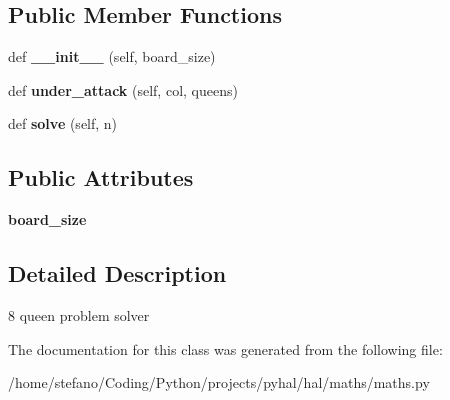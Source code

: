 \subsection*{Public Member Functions}
\begin{DoxyCompactItemize}
\item 
def {\bfseries \+\_\+\+\_\+init\+\_\+\+\_\+} (self, board\+\_\+size)\hypertarget{classhal_1_1maths_1_1maths_1_1_eight_queen_a71642e4346629fda32e51c647c28fa3f}{}\label{classhal_1_1maths_1_1maths_1_1_eight_queen_a71642e4346629fda32e51c647c28fa3f}

\item 
def {\bfseries under\+\_\+attack} (self, col, queens)\hypertarget{classhal_1_1maths_1_1maths_1_1_eight_queen_a8e7e221caa5ac408c49d69116076595e}{}\label{classhal_1_1maths_1_1maths_1_1_eight_queen_a8e7e221caa5ac408c49d69116076595e}

\item 
def {\bfseries solve} (self, n)\hypertarget{classhal_1_1maths_1_1maths_1_1_eight_queen_a8147e8ea2dabfa44b3c8d13e04d7b529}{}\label{classhal_1_1maths_1_1maths_1_1_eight_queen_a8147e8ea2dabfa44b3c8d13e04d7b529}

\end{DoxyCompactItemize}
\subsection*{Public Attributes}
\begin{DoxyCompactItemize}
\item 
{\bfseries board\+\_\+size}\hypertarget{classhal_1_1maths_1_1maths_1_1_eight_queen_a8d242fe77a100b25c6ab6e861069623b}{}\label{classhal_1_1maths_1_1maths_1_1_eight_queen_a8d242fe77a100b25c6ab6e861069623b}

\end{DoxyCompactItemize}


\subsection{Detailed Description}
\begin{DoxyVerb}8 queen problem solver \end{DoxyVerb}
 

The documentation for this class was generated from the following file\+:\begin{DoxyCompactItemize}
\item 
/home/stefano/\+Coding/\+Python/projects/pyhal/hal/maths/maths.\+py\end{DoxyCompactItemize}
